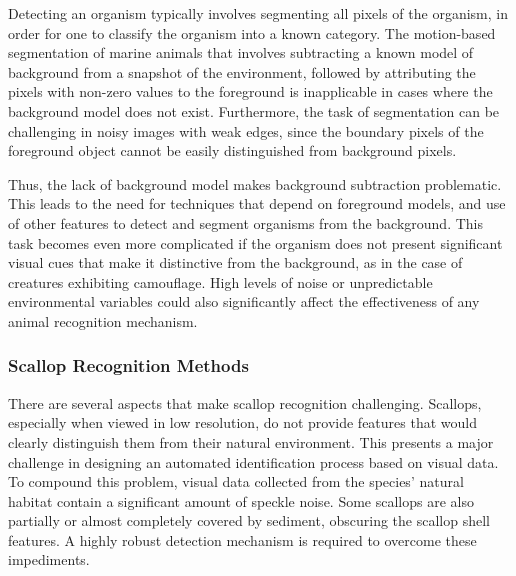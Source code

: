 Detecting an organism typically involves segmenting all pixels of the organism, in order for one to classify the organism into a known category. 
The motion-based segmentation of marine animals that involves subtracting a known model of background from a snapshot of the environment, followed by attributing the pixels with non-zero values to the foreground is inapplicable in cases where the background model does not exist. 
Furthermore, the task of segmentation can be challenging in noisy images with weak edges, since the boundary pixels of the foreground object cannot be easily distinguished from background pixels.

Thus, the lack of background model makes background subtraction problematic. This leads to the need for techniques that depend on foreground models, and use of other features to detect and segment organisms from the background. This task becomes even more complicated if the organism does not present significant visual cues that make it distinctive from the background, as in the case of creatures exhibiting camouflage. High levels of noise or unpredictable environmental variables could also significantly affect the effectiveness of any animal recognition mechanism.


\subsubsection{Scallop Recognition Methods}


There are several aspects that make scallop recognition challenging.
Scallops, especially when viewed in low resolution, do not provide features
that would clearly distinguish them from their natural environment.  This
presents a major challenge in designing an automated identification process 
based on visual data.  To compound this problem, visual data collected
from the species' natural habitat contain a
significant amount of speckle noise.
Some scallops are also partially or almost completely
covered by sediment, obscuring the scallop shell features.
A highly robust detection mechanism is required to overcome these impediments.

